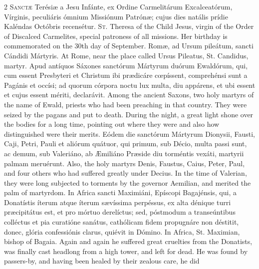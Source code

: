 \begin{paracol}{2}
\lettrine[lines=2]{S}{anctæ} Terésiæ a Jesu 
 Infánte, ex Ordine Carmelitárum Excalceatórum, Vírginis, peculiáris ómnium 
 Missiónum Patrónæ; cujus dies natális prídie Kaléndas Octóbris recensétur.
\switchcolumn
{}
\lettrine[lines=2]{S}{t.} Theresa of the Child Jesus, 
 virgin of the Order of Discalced Carmelites, special patroness of all 
 missions. Her birthday is commemorated on the 30th day of September.
\switchcolumn*
{}
Romæ, ad Ursum pileátum, 
 sancti Cándidi Mártyris.
\switchcolumn
{}
At Rome, near the place called Ursus 
 Pileatus, St. Candidus, martyr.
\switchcolumn*
{}
Apud antíquos Sáxones 
 sanctórum Mártyrum duórum Ewaldórum, qui, cum essent Presbyteri et Christum 
 ibi prædicáre cœpíssent, comprehénsi sunt a Pagánis et occísi; ad quorum 
 córpora noctu lux multa, diu appárens, et ubi essent et cujus essent mériti, 
 declarávit.
\switchcolumn
{}
Among the ancient Saxons, two holy 
 martyrs of the name of Ewald, priests who had been preaching in that 
 country. They were seized by the pagans and put to death. During 
 the night, a great light shone over the bodies for a long time, pointing out 
 where they were and also how distinguished were their merits.
\switchcolumn*
{}
Eódem die sanctórum 
 Mártyrum Dionysii, Fausti, Caji, Petri, Pauli et aliórum quátuor, qui primum, 
 sub Décio, multa passi sunt, ac demum, sub Valeriáno, ab Æmiliáno Præside 
 diu torméntis vexáti, martyrii palmam meruérunt.
\switchcolumn
{}
Also, the holy martyrs Denis, 
 Faustus, Caius, Peter, Paul, and four others who had suffered greatly under 
 Decius. In the time of Valerian, they were long subjected to torments 
 by the governor Aemilian, and merited the palm of martyrdom.
\switchcolumn*
{}
In Africa sancti 
 Maximiáni, Epíscopi Bagajénsis, qui, a Donatístis íterum atque íterum 
 sævíssima perpéssus, ex alta dénique turri præcipitátus est, et pro mórtuo 
 derelíctus; sed, póstmodum a transeúntibus colléctus et pia curatióne 
 sanátus, cathólicam fidem propugnáre non déstitit, donec, glória 
 confessiónis clarus, quiévit in Dómino.
\switchcolumn
{}
In Africa, St. Maximian, bishop of 
 Bagaia. Again and again he suffered great cruelties from the Donatists, 
 was finally cast headlong from a high tower, and left for dead. He was 
 found by passers-by, and having been healed by their zealous care, he did 

\end{paracol}
